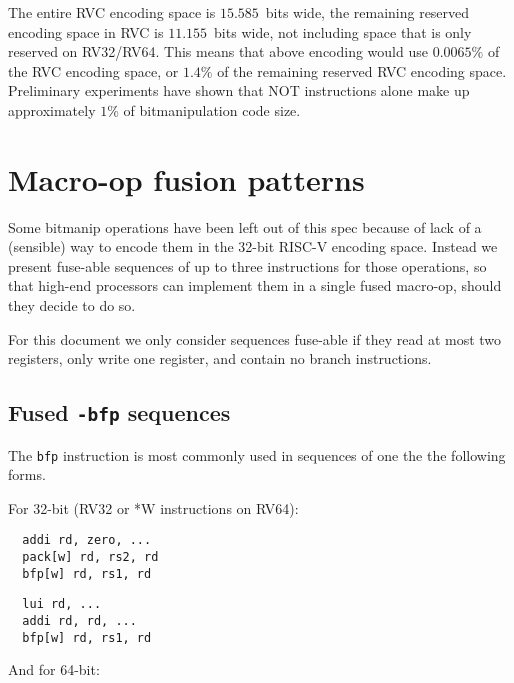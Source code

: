 The entire RVC encoding space is $15.585$~bits wide, the remaining reserved
encoding space in RVC is $11.155$~bits wide, not including space that is only
reserved on RV32/RV64. This means that above encoding would use $0.0065\%$ of
the RVC encoding space, or $1.4\%$ of the remaining reserved RVC encoding
space. Preliminary experiments have shown that NOT instructions alone make up
approximately $1\%$ of bitmanipulation code size.~\cite{Wolf17A}


\section{Macro-op fusion patterns}

Some bitmanip operations have been left out of this spec because of lack of a (sensible) way
to encode them in the 32-bit RISC-V encoding space. Instead we present fuse-able sequences
of up to three instructions for those operations, so that high-end processors can implement
them in a single fused macro-op, should they decide to do so.

For this document we only consider sequences fuse-able if they read at most two
registers, only write one register, and contain no branch instructions.

\subsection{Fused {\tt *-bfp} sequences}

The {\tt bfp} instruction is most commonly used in sequences of one the the following forms.

For 32-bit (RV32 or *W instructions on RV64):

\begin{minipage}{\linewidth}
\begin{verbatim}
  addi rd, zero, ...
  pack[w] rd, rs2, rd
  bfp[w] rd, rs1, rd
\end{verbatim}
\end{minipage}

\begin{minipage}{\linewidth}
\begin{verbatim}
  lui rd, ...
  addi rd, rd, ...
  bfp[w] rd, rs1, rd
\end{verbatim}
\end{minipage}

And for 64-bit:

